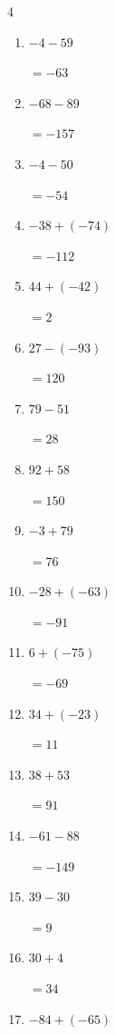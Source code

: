 \begin{multicols}{4}
\begin{enumerate}
  \item $-4-59$

        $=-63$

  \item $-68-89$

        $=-157$

  \item $-4-50$

        $=-54$

  \item $-38+(-74)$

        $=-112$

  \item $44+(-42)$

        $=2$

  \item $27-(-93)$

        $=120$

  \item $79-51$

        $=28$

  \item $92+58$

        $=150$

  \item $-3+79$

        $=76$

  \item $-28+(-63)$

        $=-91$

  \item $6+(-75)$

        $=-69$

  \item $34+(-23)$

        $=11$

  \item $38+53$

        $=91$

  \item $-61-88$

        $=-149$

  \item $39-30$

        $=9$

  \item $30+4$

        $=34$

\columnbreak %

  \item $-84+(-65)$


\end{enumerate}
\end{multicols}
